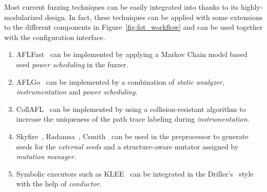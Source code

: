 Most current fuzzing techniques can be easily integrated into {\FOT} thanks to its highly-modularized design. In fact, these techniques can be applied with some extensions to the different components in Figure~\ref{fig:fot_workflow} and can be used together with the configuration interface. 

\begin{enumerate}[1)]
	\item AFLFast~\cite{Bohme:2016:CGF} can be implemented by applying a Markov Chain model based seed \emph{power scheduling} in the fuzzer. 
	\item AFLGo~\cite{Bohme:2017:DGF} can be implemented by a combination of \emph{static analyzer}, \emph{instrumentation} and \emph{power scheduling}.
	\item CollAFL~\cite{CollAFL} can be implemented by using a collision-resistant algorithm to increase the uniqueness of the path trace labeling during \emph{instrumentation}.
	\item Skyfire~\cite{junjie:2017sp:skyfire}, Radamsa~\cite{radamsa}, Csmith~\cite{csmith} can be used in the preprocessor to generate seeds for the \emph{external seeds} and a structure-aware mutator assigned by \emph{mutation manager}.
	\item Symbolic executors such as KLEE~\cite{klee} can be integrated in the Driller's~\cite{driller} style with the help of \emph{conductor}.
\end{enumerate}

